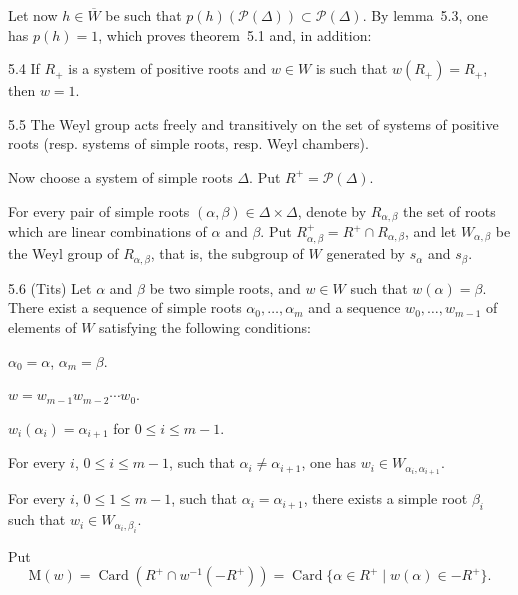Let now $h\in\overline W$ be such that $p(h)(\mathcal P(\Delta))\subset\mathcal P(\Delta)$. By lemma~5.3, one has $p(h)=1$, which proves theorem~5.1 and, in addition:
\begin{corollary}{5.4}\label{XXI.5.4}
If $R_+$ is a system of positive roots and $w\in W$ is such that $w(R_+)=R_+$, then $w=1$.
\end{corollary}
\begin{corollary}{5.5}\label{XXI.5.5}
The Weyl group acts freely and transitively on the set of systems of positive roots (resp. systems of simple roots, resp. Weyl chambers).
\end{corollary}
Now choose a system of simple roots $\Delta$. Put $R^+=\mathcal P(\Delta)$.

{\renewcommand{\thefootnote}{(23)}}%
For every pair of simple roots $(\alpha,\beta)\in\Delta\times\Delta$, denote by $R_{\alpha,\beta}$ the set of roots which are linear combinations of $\alpha$ and $\beta$. Put $R_{\alpha,\beta}^+=R^+\cap R_{\alpha,\beta}$, and let $W_{\alpha,\beta}$ be the Weyl group of $R_{\alpha,\beta}$, that is, the subgroup of $W$ generated by $s_\alpha$ and $s_\beta$.
\begin{theorem}{5.6 (Tits)}\label{XXI.5.6}
Let $\alpha$ and $\beta$ be two simple roots, and $w\in W$ such that $w(\alpha)=\beta$. There exist a sequence of simple roots $\alpha_0,\ldots,\alpha_m$ and a sequence $w_0,\ldots,w_{m-1}$ of elements of $W$ satisfying the following conditions:
\begin{enumeratei}
\item $\alpha_0=\alpha$, $\alpha_m=\beta$.
\item $w=w_{m-1}w_{m-2}\cdots w_0$.
\item $w_i(\alpha_i)=\alpha_{i+1}$ for $0\leq i\leq m-1$.
\item For every $i$, $0\leq i\leq m-1$, such that $\alpha_i\ne\alpha_{i+1}$, one has $w_i\in W_{\alpha_i,\alpha_{i+1}}$.
\item For every $i$, $0\leq1\leq m-1$, such that $\alpha_i=\alpha_{i+1}$, there exists a simple root $\beta_i$ such that $w_i\in W_{\alpha_i,\beta_i}$.
\end{enumeratei}
\end{theorem}
Put{\renewcommand{\thefootnote}{(24)}}
\[
\mathrm M(w)=\operatorname{Card}(R^+\cap w^{-1}(-R^+))=\operatorname{Card}\{\alpha\in R^+\mid w(\alpha)\in-R^+\}.
\]
